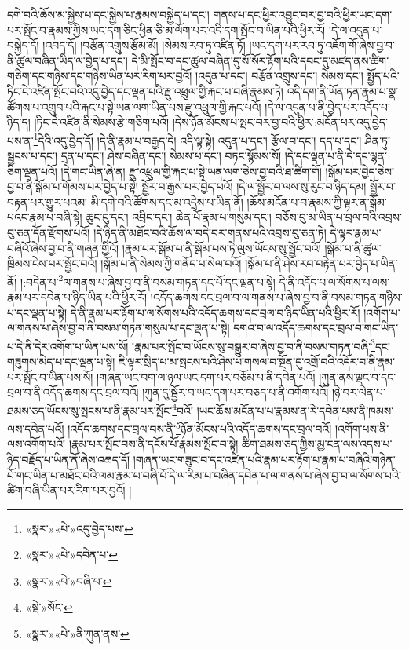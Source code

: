དགེ་བའི་ཆོས་མ་སྐྱེས་པ་དང་སྐྱེས་པ་རྣམས་བསྐྱེད་པ་དང་། གནས་པ་དང་ཕྱིར་འབྱུང་བར་བྱ་བའི་ཕྱིར་ཡང་དག་པར་སྤོང་བ་རྣམས་ཀྱིས་ཡང་དག་ཅིང་ཕྱིན་ཅི་མ་ལོག་པར་འདི་དག་སྤོང་བ་ཡིན་པའི་ཕྱིར་རོ། །དེ་ལ་འདུན་པ་བསྐྱེད་དོ། །འབད་དོ། །བརྩོན་འགྲུས་རྩོམ་མོ། །སེམས་རབ་ཏུ་འཛིན་ཏོ། །ཡང་དག་པར་རབ་ཏུ་འཇོག་གོ་ཞེས་བྱ་བ་ནི་ཚུལ་བཞིན་ཡིད་ལ་བྱེད་པ་དང་། དེ་མི་སྤོང་བ་དང་ཚུལ་བཞིན་དུ་སོ་སོར་རྟོག་པའི་དབང་དུ་མཛད་ནས་ཚིག་གཅིག་དང་གཉིས་དང་གཉིས་ཡིན་པར་རིག་པར་བྱའོ། །འདུན་པ་དང་། བརྩོན་འགྲུས་དང་། སེམས་དང་། སྤྱོད་པའི་ཏིང་ངེ་འཛིན་སྤོང་བའི་འདུ་བྱེད་དང་ལྡན་པའི་རྫུ་འཕྲུལ་གྱི་རྐང་པ་བཞི་རྣམས་ཏེ། འདི་དག་ནི་ཡོན་ཏན་རྣམ་པ་སྣ་ཚོགས་པ་འགྲུབ་པའི་རྐང་པ་སྟེ་ཡན་ལག་ཡིན་པས་རྫུ་འཕྲུལ་གྱི་རྐང་པའོ། །དེ་ལ་འདུན་པ་ནི་བྱེད་པར་འདོད་པ་ཉིད་ད། །ཏིང་ངེ་འཛིན་ནི་སེམས་རྩེ་གཅིག་པའོ། །དེས་ཉོན་མོངས་པ་སྤང་བར་བྱ་བའི་ཕྱིར་:མངོན་པར་འདུ་བྱེད་པས་ན་\footnote{«སྣར་»«པེ་»འདུ་བྱེད་པས་}དེའི་འདུ་བྱེད་དོ། །དེ་ནི་རྣམ་པ་བརྒྱད་དེ། འདི་ལྟ་སྟེ། འདུན་པ་དང་། རྩོལ་བ་དང་། དད་པ་དང་། ཤིན་ཏུ་སྦྱངས་པ་དང་། དྲན་པ་དང་། ཤེས་བཞིན་དང་། སེམས་པ་དང་། བཏང་སྙོམས་སོ། །དེ་དང་ལྡན་པ་ནི་དེ་དང་ལྷན་ཅིག་ལྡན་པའོ། །དེ་གང་ཡིན་ཞེ་ན། རྫུ་འཕྲུལ་གྱི་རྐང་པ་སྟེ་ཡན་ལག་ཅེས་བྱ་བའི་ཐ་ཚིག་གོ། །སྒོམ་པར་བྱེད་ཅེས་བྱ་བ་ནི་སྒོམ་པ་གོམས་པར་བྱེད་པ་སྟེ། སྦྱོར་བ་རྒྱས་པར་བྱེད་པའོ། །དེ་ལ་སྦྱོར་བ་ལས་སུ་རུང་བ་ཉིད་དམ། སྦྱོར་བ་བརྟན་པར་གྱུར་པའམ། མི་དགེ་བའི་ཚོགས་དང་མ་འདྲེས་པ་ཡིན་ནོ། །ཆོས་མངོན་པ་བ་རྣམས་ཀྱི་ལྟར་ན་སྒོམ་པའང་རྣམ་པ་བཞི་སྟེ། ཆུང་ངུ་དང་། འབྲིང་དང་། ཆེན་པོ་རྣམ་པ་གསུམ་དང་། བཅོས་བུ་མ་ཡིན་པ་བྲལ་བའི་འབྲས་བུ་ཅན་དོན་རྫོགས་པའོ། །དེ་ཉིད་ནི་མཐོང་བའི་ཆོས་ལ་བདེ་བར་གནས་པའི་འབྲས་བུ་ཅན་ཏེ། དེ་ལྟར་རྣམ་པ་བཞིའོ་ཞེས་བྱ་བ་ནི་གཞན་གྱིའོ། །རྣམ་པར་སྒོམ་པ་ནི་སྒོམ་པས་ཏེ་ལུས་ཡོངས་སུ་སྦྱོང་བའོ། །སྒོམ་པ་ནི་ཚུལ་ཁྲིམས་ངེས་པར་སྦྱོང་བའོ། །སྒོམ་པ་ནི་སེམས་ཀྱི་གནོད་པ་སེལ་བའོ། །སྒོམ་པ་ནི་ཤེས་རབ་བརྟེན་པར་བྱེད་པ་ཡིན་ནོ། །:བདེན་པ་\footnote{«སྣར་»«པེ་»དབེན་པ་}ལ་གནས་པ་ཞེས་བྱ་བ་ནི་བསམ་གཏན་དང་པོ་དང་ལྡན་པ་སྟེ། དེ་ནི་འདོད་པ་ལ་སོགས་པ་ལས་རྣམ་པར་དབེན་པ་ཉིད་ཡིན་པའི་ཕྱིར་རོ། །འདོད་ཆགས་དང་བྲལ་བ་ལ་གནས་པ་ཞེས་བྱ་བ་ནི་བསམ་གཏན་གཉིས་པ་དང་ལྡན་པ་སྟེ། དེ་ནི་རྣམ་པར་རྟོག་པ་ལ་སོགས་པའི་འདོད་ཆགས་དང་བྲལ་བ་ཉིད་ཡིན་པའི་ཕྱིར་རོ། །འགོག་པ་ལ་གནས་པ་ཞེས་བྱ་བ་ནི་བསམ་གཏན་གསུམ་པ་དང་ལྡན་པ་སྟེ། དགའ་བ་ལ་འདོད་ཆགས་དང་བྲལ་བ་གང་ཡིན་པ་དེ་ནི་དེར་འགོག་པ་ཡིན་པས་སོ། །རྣམ་པར་སྤོང་བ་ཡོངས་སུ་བསྒྱུར་བ་ཞེས་བྱ་བ་ནི་བསམ་གཏན་བཞི་\footnote{«སྣར་»«པེ་»བཞི་པ་}དང་གཟུགས་མེད་པ་དང་ལྡན་པ་སྟེ། ཇི་ལྟར་སྲིད་པ་མ་སྤངས་པའི་ཤེས་པ་གསལ་བ་སྔོན་དུ་འགྲོ་བའི་འདོར་བ་ནི་རྣམ་པར་སྤོང་བ་ཡིན་པས་སོ། །གཞན་ཡང་བག་ལ་ཉལ་ཡང་དག་པར་བཅོམ་པ་ནི་དབེན་པའོ། །ཀུན་ནས་ལྡང་བ་དང་བྲལ་བ་ནི་འདོད་ཆགས་དང་བྲལ་བའོ། །ཀུན་དུ་སྦྱོར་བ་ཡང་དག་པར་བཅད་པ་ནི་འགོག་པའོ། །ཉེ་བར་ལེན་པ་ཐམས་ཅད་ཡོངས་སུ་སྤངས་པ་ནི་རྣམ་པར་སྤོང་\footnote{«སྡེ་»སོང་}བའོ། །ཡང་ཆོས་མངོན་པ་པ་རྣམས་ན་རེ་དབེན་པས་ནི་ཁམས་ལས་དབེན་པའོ། །འདོད་ཆགས་དང་བྲལ་བས་ནི་\footnote{«སྣར་»«པེ་»ནི་ཀུན་ནས་}ཉོན་མོངས་པའི་འདོད་ཆགས་དང་བྲལ་བའོ། །འགོག་པས་ནི་ལས་འགོག་པའོ། །རྣམ་པར་སྤོང་བས་ནི་དངོས་པོ་རྣམས་སྤོང་བ་སྟེ། ཚིག་ཐམས་ཅད་ཀྱིས་མྱ་ངན་ལས་འདས་པ་ཉིད་བརྗོད་པ་ཡིན་ནོ་ཞེས་འཆད་དོ། །གཞན་ཡང་གཟུང་བ་དང་འཛིན་པའི་རྣམ་པར་རྟོག་པ་རྣམ་པ་བཞིའི་གཉེན་པོ་གང་ཡིན་པ་མཐོང་བའི་ལམ་རྣམ་པ་བཞི་པོ་དེ་ལ་རིམ་པ་བཞིན་དབེན་པ་ལ་གནས་པ་ཞེས་བྱ་བ་ལ་སོགས་པའི་ཚིག་བཞི་ཡིན་པར་རིག་པར་བྱའོ། །
